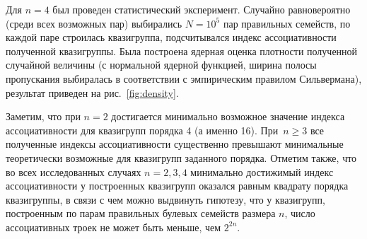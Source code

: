     Для $n = 4$ был проведен статистический эксперимент.
    Случайно равновероятно (среди всех возможных пар) выбирались $N = 10^5$ пар правильных семейств, по каждой паре строилась квазигруппа, подсчитывался индекс ассоциативности полученной квазигруппы.
    Была построена ядерная оценка плотности полученной случайной величины (с нормальной ядерной функцией, ширина полосы пропускания выбиралась в соответствии с эмпирическим правилом Сильвермана), результат приведен на рис.~\ref{fig:density}.

    \begin{figure}[ht] %
    \end{figure}



    \begin{figure}[ht] %
    \end{figure}

    Заметим, что при $n = 2$ достигается минимально возможное значение индекса ассоциативности для квазигрупп порядка 4 (а именно 16).
    При~$n \ge 3$ все полученные индексы ассоциативности существенно превышают минимальные теоретически возможные для квазигрупп заданного порядка.
    Отметим также, что во всех исследованных случаях $n = 2, 3, 4$ минимально достижимый индекс ассоциативности у построенных квазигрупп оказался равным квадрату порядка квазигруппы, в связи с чем можно выдвинуть гипотезу, что у квазигрупп, построенным по парам правильных булевых семейств размера $n$, число ассоциативных троек не может быть меньше, чем $2^{2n}$.

    \begin{figure}[ht] %
    \end{figure}

